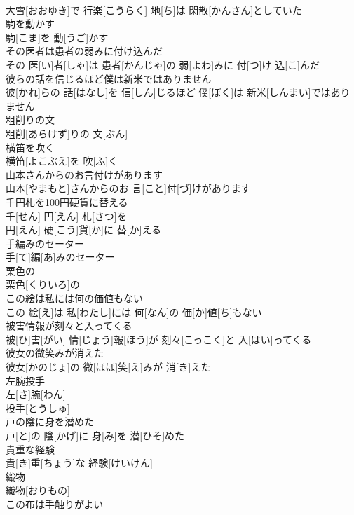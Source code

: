 \documentclass[8pt]{extreport}
\begin{document}
\begin{CJK}{UTF8}{min}
\\	大雪[おおゆき]で 行楽[こうらく] 地[ち]は 閑散[かんさん]としていた
\\	駒を動かす	
\\	駒[こま]を 動[うご]かす
\\	その医者は患者の弱みに付け込んだ	
\\	その 医[い]者[しゃ]は 患者[かんじゃ]の 弱[よわ]みに 付[つ]け 込[こ]んだ
\\	彼らの話を信じるほど僕は新米ではありません	
\\	彼[かれ]らの 話[はなし]を 信[しん]じるほど 僕[ぼく]は 新米[しんまい]ではありません
\\	粗削りの文	
\\	粗削[あらけず]りの 文[ぶん]
\\	横笛を吹く	
\\	横笛[よこぶえ]を 吹[ふ]く
\\	山本さんからのお言付けがあります	
\\	山本[やまもと]さんからのお 言[こと]付[づ]けがあります
\\	千円札を100円硬貨に替える	
\\	千[せん] 円[えん] 札[さつ]を 
\\	円[えん] 硬[こう]貨[か]に 替[か]える
\\	手編みのセーター	
\\	手[て]編[あ]みのセーター
\\	栗色の	
\\	栗色[くりいろ]の
\\	この絵は私には何の価値もない	
\\	この 絵[え]は 私[わたし]には 何[なん]の 価[か]値[ち]もない
\\	被害情報が刻々と入ってくる	
\\	被[ひ]害[がい] 情[じょう]報[ほう]が 刻々[こっこく]と 入[はい]ってくる
\\	彼女の微笑みが消えた	
\\	彼女[かのじょ]の 微[ほほ]笑[え]みが 消[き]えた
\\	左腕投手	
\\	左[さ]腕[わん]
\\	投手[とうしゅ]
\\	戸の陰に身を潜めた	
\\	戸[と]の 陰[かげ]に 身[み]を 潜[ひそ]めた
\\	貴重な経験	
\\	貴[き]重[ちょう]な 経験[けいけん]
\\	織物	
\\	織物[おりもの]
\\	この布は手触りがよい	

\end{CJK}
\end{document}
